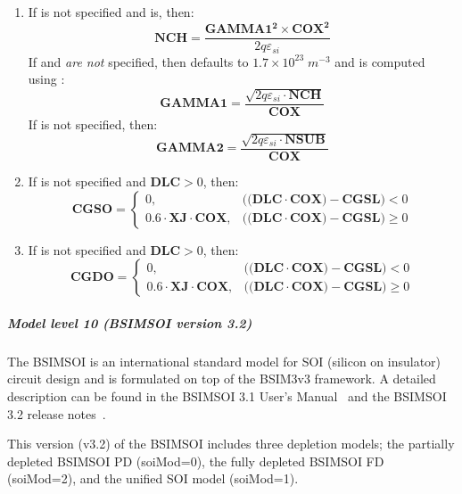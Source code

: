 \begin{enumerate}
\item If  is not specified and  is, then:
\[
\mathbf{NCH} = \frac{\mathbf{GAMMA1^2 \times \mathbf{COX}^2}}
{2q \varepsilon_{si}}
\]
If  and  {\em are not} specified, then
 defaults to $1.7\times10^{23}\;m^{-3}$ and  is
computed using :
\[
\mathbf{GAMMA1} = \frac{\sqrt{2q\varepsilon_{si} \cdot \mathbf{NCH}}}
{\mathbf{COX}}
\]
If  is not specified, then:
\[
\mathbf{GAMMA2} = \frac{\sqrt{2q\varepsilon_{si} \cdot \mathbf{NSUB}}}
{\mathbf{COX}}
\]

\item If  is not specified and $\mathbf{DLC} > 0$, then:
\[
\mathbf{CGSO} = \left\{ \begin{array}{ll}
0, & ((\mathbf{DLC \cdot COX) - CGSL)} < 0        \\
0.6 \cdot \mathbf{XJ \cdot COX}, & ((\mathbf{DLC \cdot COX) - CGSL)}
\geq 0
\end{array}
\right.
\]

\item If  is not specified and $\mathbf{DLC} > 0$, then:
\[
\mathbf{CGDO} = \left\{ \begin{array}{ll}
0, & ((\mathbf{DLC \cdot COX) - CGSL)} < 0 \\
0.6 \cdot \mathbf{XJ \cdot COX},
& ((\mathbf{DLC \cdot COX) - CGSL)} \geq 0
\end{array}
\right. \]
\end{enumerate}

\subparagraph{Model level 10 (BSIMSOI version 3.2)}

The BSIMSOI is an international standard model for SOI (silicon on insulator)
circuit design and is formulated on top of the BSIM3v3 framework.
A detailed description can be found in the BSIMSOI 3.1 User's
Manual~\cite{BSIMSOI:Manual} and the BSIMSOI 3.2 release
notes~\cite{BSIMSOI:3p2:Notes}.

This version (v3.2) of the BSIMSOI includes three depletion models;
the partially depleted BSIMSOI PD (soiMod=0), the fully depleted BSIMSOI
FD (soiMod=2), and the unified SOI model (soiMod=1).

